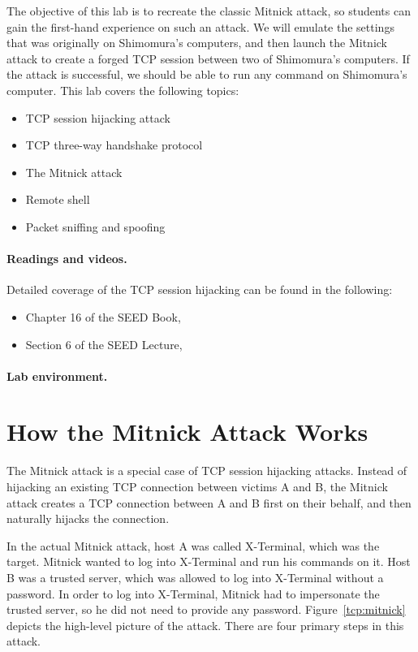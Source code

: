 The objective of this lab is to recreate the classic Mitnick attack, 
so students can gain the first-hand experience on such an attack. 
We will emulate the settings that was originally on 
Shimomura's computers, and then 
launch the Mitnick attack to create a forged TCP session between
two of Shimomura's computers. If the attack is successful, 
we should be able to run any command on Shimomura's computer. 
This lab covers the following topics:

\begin{itemize}[noitemsep]
\item TCP session hijacking attack
\item TCP three-way handshake protocol
\item The Mitnick attack
\item Remote shell \rsh
\item Packet sniffing and spoofing
\end{itemize}


\paragraph{Readings and videos.}
Detailed coverage of the TCP session hijacking can be found in the following:

\begin{itemize}
\item Chapter 16 of the SEED Book, \seedbook
\item Section 6 of the SEED Lecture, \seedisvideo
\end{itemize}

\paragraph{Lab environment.} \seedenvironmentC



\section{How the Mitnick Attack Works}

The Mitnick attack is a special case of TCP session hijacking attacks. 
Instead of hijacking an existing TCP connection between victims A and B, 
the Mitnick attack creates a TCP connection between A and B first on 
their behalf, and then naturally hijacks the connection.  


In the actual Mitnick attack, host A was called X-Terminal, 
which was the target. Mitnick
wanted to log into X-Terminal and run his commands on it. 
Host B was a trusted server, which was allowed to log into X-Terminal without a password.  
In order to log into X-Terminal, Mitnick had to impersonate the trusted server, so
he did not need to provide any password. Figure~\ref{tcp:mitnick} depicts
the high-level picture of the attack. 
There are four primary steps in this attack.


